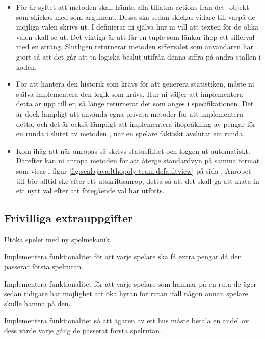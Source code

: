\begin{itemize}
\item  För  är syftet att metoden skall hämta alla tillåtna actions från det -objekt som skickas med som argument. Dessa ska sedan skickas vidare till  varpå de möjliga valen skrivs ut. I  definierar ni själva hur ni vill att texten för de olika valen skall se ut. Det viktiga är att  får en tuple som länkar ihop ett sifferval med en sträng. Slutligen returnerar metoden siffervalet som användaren har gjort så att det går att ta logiska beslut utifrån denna siffra på andra ställen i koden.

\item  För att hantera den historik som krävs för att generera statistiken, måste ni själva implementera den logik som krävs. Hur ni väljer att implementera detta är upp till er, så länge  returnerar det som anges i specifikationen. Det är dock lämpligt att använda egna privata metoder för att implementera detta, och det är också lämpligt att implementera ihopräkning av pengar för en runda i slutet av metoden , när en spelare faktiskt avslutar sin runda.
\item Kom ihåg att när  anropas så skrivs statusfältet och loggen ut automatiskt. Därefter kan ni anropa metoden  för att återge standardvyn på samma format som visas i figur \ref{fig:scalajava:lthopoly-team:defaultview} på sida \pageref{fig:scalajava:lthopoly-team:defaultview}.
Anropet till  bör alltid ske efter ett utskriftsanrop, detta så att det skall gå att mata in ett nytt val efter att föregående val har utförts.

\end{itemize}

\subsection{Frivilliga extrauppgifter}

\Task Utöka spelet med ny spelmekanik.

\Subtask Implementera funktionalitet för att varje spelare ska få extra pengar då den passerar första spelrutan.

\Subtask Implementera funktionalitet för att varje spelare som hamnar på en ruta de äger sedan tidigare har möjlighet att öka hyran för rutan ifall någon annan spelare skulle hamna på den.

\Subtask Implementera funktionalitet så att ägaren av ett hus måste betala en andel av dess värde varje gång de passerat första spelrutan.

